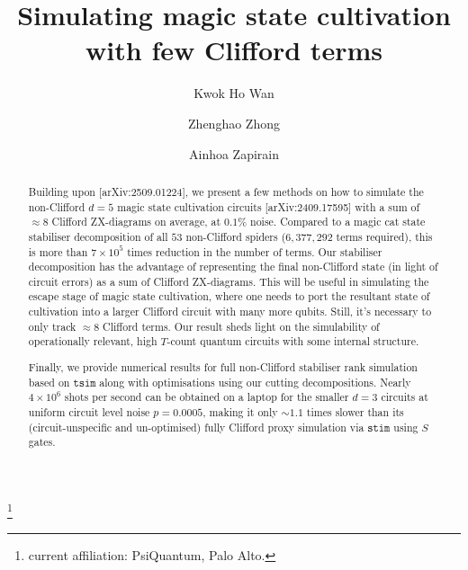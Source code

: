 \documentclass[a4paper,onecolumn,11pt,accepted=2026-06-10]{quantumarticle}
\begin{document}
\title{Simulating magic state cultivation with few Clifford terms}


\author{Kwok Ho Wan}
\thanks{current affiliation: PsiQuantum, Palo Alto.}
\author{Zhenghao Zhong}
\author{Ainhoa Zapirain}

\begin{abstract}
Building upon [arXiv:2509.01224], we present a few methods on how to simulate the non-Clifford $d=5$ magic state cultivation circuits [arXiv:2409.17595] with a sum of $\approx 8$ Clifford ZX-diagrams on average, at $0.1\%$ noise. Compared to a magic cat state stabiliser decomposition of all $53$ non-Clifford spiders ($6{,}377{,}292$ terms required), this is more than $7 \times 10^{5}$ times reduction in the number of terms. Our stabiliser decomposition has the advantage of representing the final non-Clifford state (in light of circuit errors) as a sum of Clifford ZX-diagrams. This will be useful in simulating the escape stage of magic state cultivation, where one needs to port the resultant state of cultivation into a larger Clifford circuit with many more qubits. Still, it's necessary to only track $\approx 8$ Clifford terms. Our result sheds light on the simulability of operationally relevant, high $T$-count quantum circuits with some internal structure.

Finally, we provide numerical results for full non-Clifford stabiliser rank simulation based on $\mathtt{tsim}$ along with optimisations using our cutting decompositions. Nearly $4\times 10^{6}$ shots per second can be obtained on a laptop for the smaller $d = 3$ circuits at uniform circuit level noise $p=0.0005$, making it only $\sim$$1.1$ times slower than its (circuit-unspecific and un-optimised) fully Clifford proxy simulation via $\mathtt{stim}$ using $S$ gates.
\end{abstract}

\maketitle
\end{document}
